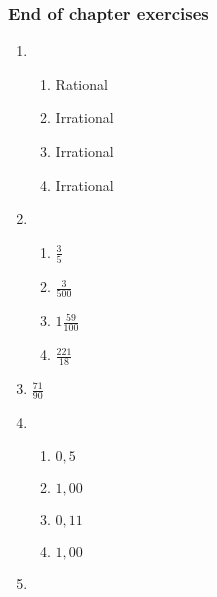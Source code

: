 {\begin{multicols}{3}
\subsubsection*{End of chapter exercises} %


\begin{enumerate}[noitemsep, label=\textbf{\arabic*}. ] 
\item%
    \begin{enumerate}[noitemsep, label=\textbf{(\alph*)} ] 
    \item Rational%
    \item Irrational%
    \item Irrational%
    \item Irrational%
    \end{enumerate}
\item %
    \begin{enumerate}[noitemsep, label=\textbf{(\alph*)} ] 
    \item $\frac{3}{5}$%
    \item $\frac{3}{500}$%
    \item $1\frac{59}{100}$%
    \item $\frac{221}{18}$%
    \end{enumerate}
\setcounter{enumi}{3}
\item $\frac{71}{90}$%


\item %
    \begin{enumerate}[noitemsep, label=\textbf{(\alph*)} ]  
    \item $0,5$%
    \item $1,00$%
    \item $0,11$%
    \item $1,00$%
    \end{enumerate}

\item %


\end{enumerate}
\end{multicols}}
